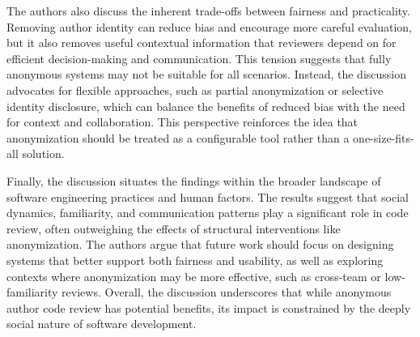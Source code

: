 The authors also discuss the inherent trade-offs between fairness and practicality. Removing author identity can reduce bias and encourage more careful evaluation, but it also removes useful contextual information that reviewers depend on for efficient decision-making and communication. This tension suggests that fully anonymous systems may not be suitable for all scenarios. Instead, the discussion advocates for flexible approaches, such as partial anonymization or selective identity disclosure, which can balance the benefits of reduced bias with the need for context and collaboration. This perspective reinforces the idea that anonymization should be treated as a configurable tool rather than a one-size-fits-all solution.

Finally, the discussion situates the findings within the broader landscape of software engineering practices and human factors. The results suggest that social dynamics, familiarity, and communication patterns play a significant role in code review, often outweighing the effects of structural interventions like anonymization. The authors argue that future work should focus on designing systems that better support both fairness and usability, as well as exploring contexts where anonymization may be more effective, such as cross-team or low-familiarity reviews. Overall, the discussion underscores that while anonymous author code review has potential benefits, its impact is constrained by the deeply social nature of software development.